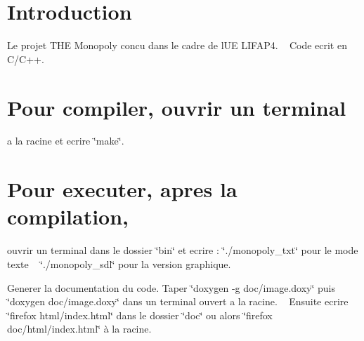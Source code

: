 \hypertarget{index_intro_sec}{}\section{Introduction}\label{index_intro_sec}
Le projet T\+HE Monopoly concu dans le cadre de l\textquotesingle{}UE L\+I\+F\+A\+P4. ~\newline
 Code ecrit en C/\+C++.\hypertarget{index_compile_sec}{}\section{Pour compiler, ouvrir un terminal}\label{index_compile_sec}
a la racine et ecrire \char`\"{}make\char`\"{}.\hypertarget{index_exec_sec}{}\section{Pour executer, apres la compilation,}\label{index_exec_sec}
ouvrir un terminal dans le dossier \char`\"{}bin\char`\"{} et ecrire \+: \char`\"{}./monopoly\+\_\+txt\char`\"{} pour le mode texte ~\newline
 \char`\"{}./monopoly\+\_\+sdl\char`\"{} pour la version graphique.

Generer la documentation du code. Taper \char`\"{}doxygen -\/g doc/image.\+doxy\char`\"{} puis \char`\"{}doxygen doc/image.\+doxy\char`\"{} dans un terminal ouvert a la racine. ~\newline
 Ensuite ecrire \char`\"{}firefox html/index.\+html\char`\"{} dans le dossier \char`\"{}doc\char`\"{} ou alors \char`\"{}firefox doc/html/index.\+html\char`\"{} à la racine. 